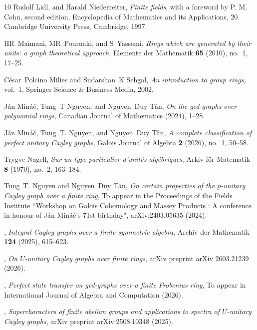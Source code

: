 \documentclass[11pt, a4paper]{amsart}
\theoremstyle{definition}
\numberwithin{equation}{section}
\begin{document}
\begin{thebibliography}{10}
 Rudolf Lidl, and Harald Niederreiter, {\it Finite fields}, with a foreword by P. M. Cohn, second edition, Encyclopedia of Mathematics and its Applications, 20. Cambridge University Press, Cambridge, 1997.

HR~Maimani, MR~Pournaki, and S~Yassemi, \emph{Rings which are generated by their units: a graph theoretical approach}, Elemente der Mathematik \textbf{65} (2010), no.~1, 17--25.

C{\'e}sar~Polcino Milies and Sudarshan~K Sehgal, \emph{An introduction to group rings}, vol.~1, Springer Science \& Business Media, 2002.

J{\'a}n Min{\'a}{\v{c}}, Tung~T Nguyen, and Nguyen~Duy T{\^a}n, \emph{On the gcd-graphs over polynomial rings}, Canadian Journal of Mathematics (2024), 1--28.

J{\'a}n Min{\'a}{\v{c}}, Tung~T. Nguyen, and Nguyen~Duy T{\^a}n, \emph{A complete classification of perfect unitary {Cayley} graphs}, Galois Journal of Algebra \textbf{2} (2026), no.~1, 50--58.

Trygve Nagell, \emph{Sur un type particulier d’unit{\'e}s alg{\'e}briques}, Arkiv f{\"o}r Matematik \textbf{8} (1970), no.~2, 163--184.

Tung~T. Nguyen and Nguyen~Duy T{\^a}n, \emph{On certain properties of the $ p $-unitary {Cayley} graph over a finite ring}, To appear in the Proceedings of the Fields Institute ``Workshop on Galois Cohomology and Massey Products : A conference in honour of J{\'a}n Min{\'a}{\v{c}}’s 71st birthday", arXiv:2403.05635 (2024).

\bysame, \emph{Integral {Cayley} graphs over a finite symmetric algebra}, Archiv der Mathematik \textbf{124} (2025), 615--623.

\bysame, \emph{On ${U}$-unitary {Cayley} graphs over finite rings}, arXiv preprint arXiv 2603.21239 (2026).

\bysame, \emph{Perfect state transfer on gcd-graphs over a finite {Frobenius} ring}, To appear in International Journal of Algebra and Computation (2026).

\bysame, \emph{Supercharacters of finite abelian groups and applications to spectra of $U$-unitary {Cayley} graphs}, arXiv preprint arXiv:2508.10348 (2025).


\end{thebibliography}
\end{document}
